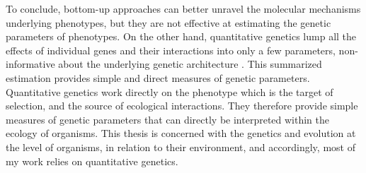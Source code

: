 
To conclude, bottom-up approaches can better unravel the molecular mechanisms underlying phenotypes, but they are not effective at estimating the genetic parameters of phenotypes. On the other hand, quantitative genetics lump all the effects of individual genes and their interactions into only a few parameters, non-informative about the underlying genetic architecture \parencite{Mackay2001,Nietlisbach2015,Huang041434}.  This summarized estimation provides simple and direct measures of genetic parameters. Quantitative genetics work directly on the phenotype which is the target of selection, and the source of ecological interactions. They therefore provide simple measures of genetic parameters that can directly be interpreted within the ecology of organisms.
This thesis is concerned with the genetics and evolution at the level of organisms, in relation to their environment, and accordingly, most of my work relies on quantitative genetics.



